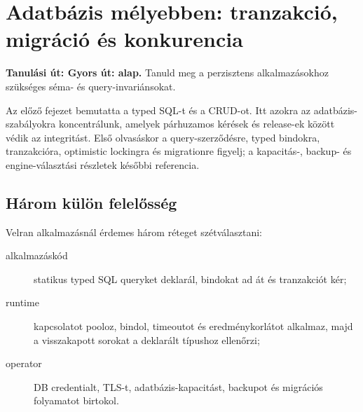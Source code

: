 \chapter{Adatbázis mélyebben: tranzakció, migráció és konkurencia}\label{ch:db-deep-dive-hu}

\noindent\textbf{Tanulási út: Gyors út: alap.} Tanuld meg a perzisztens alkalmazásokhoz szükséges séma- és query-invariánsokat.\par\medskip





Az előző fejezet bemutatta a typed SQL-t és a CRUD-ot. Itt azokra az adatbázis-szabályokra koncentrálunk, amelyek párhuzamos kérések és release-ek között védik az integritást. Első olvasáskor a query-szerződésre, typed bindokra, tranzakcióra, optimistic lockingra és migrationre figyelj; a kapacitás-, backup- és engine-választási részletek későbbi referencia.

\section{Három külön felelősség}

Velran alkalmazásnál érdemes három réteget szétválasztani:

\begin{description}
\item[alkalmazáskód] statikus typed SQL queryket deklarál, bindokat ad át és tranzakciót kér;
\item[runtime] kapcsolatot pooloz, bindol, timeoutot és eredménykorlátot alkalmaz, majd a visszakapott sorokat a deklarált típushoz ellenőrzi;
\item[operator] DB credentialt, TLS-t, adatbázis-kapacitást, backupot és migrációs folyamatot birtokol.
\end{description}

